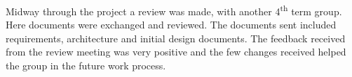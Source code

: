 Midway through the project a review was made, with another 4\textsuperscript{th} term group. Here documents were exchanged and reviewed. The documents sent included requirements, architecture and initial design documents. The feedback received from the review meeting was very positive and the few changes received helped the group in the future work process. 